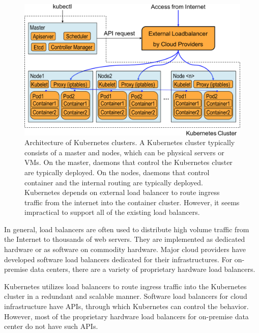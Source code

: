 \begin{figure}[h]
  \centering
  \includegraphics[width=0.8\columnwidth]{Figs/K8sConventional}
  
  \centering
  
  \begin{minipage}{0.9\columnwidth}
    \caption[Architecture of Kubernetes clusters]{
      Architecture of Kubernetes clusters.
      A Kubernetes cluster typically consists of a master and nodes, which can be physical servers or VMs.
      On the master, daemons that control the Kubernetes cluster are typically deployed. 
      On the nodes,  daemons that control container and the internal routing are typically deployed.
      Kubernetes depends on external load balancer to route ingress traffic from the internet into the container cluster.
      However, it seems impractical to support all of the existing load balancers.
    }
    \label{fig:k8s_intro}
  \end{minipage}
  
\end{figure}

In general, load balancers are often used to distribute high volume traffic from the Internet to thousands of web servers.
They are implemented as dedicated hardware or as software on commodity hardware.
Major cloud providers have developed software load balancers\cite{eisenbud2016maglev,patel2013ananta} dedicated for their infrastructures.
For on-premise data centers, there are a variety of proprietary hardware load balancers.

Kubernetes utilizes load balancers to route ingress traffic into the Kubernetes cluster in a redundant and scalable manner. 
Software load balancers for cloud infrastructure have APIs, through which Kubernetes can control the behavior.
However, most of the proprietary hardware load balancers for on-premise data center do not have such APIs.


